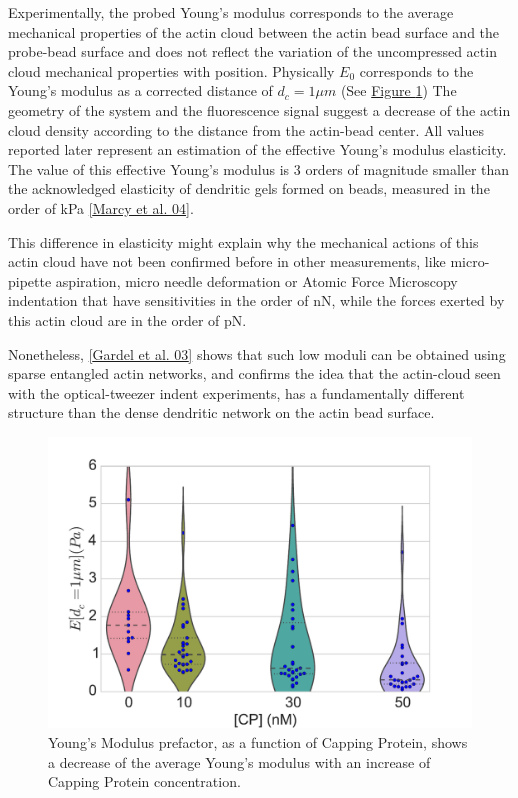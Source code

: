 \documentclass[A4paperpaper,11pt,english]{sphinxmanual}
\begin{document}
Experimentally, the probed Young's modulus corresponds to the average mechanical
properties of the actin cloud between the actin bead surface and the
probe-bead surface and does not reflect the variation of the uncompressed actin cloud mechanical
properties with position.
Physically \(E_0\) corresponds to the Young's modulus as a corrected distance of \(d_c = 1 \mu{}m\)
(See \hyperref[index-latex:ev]{Figure  \ref*{index-latex:ev}})
The geometry of the
system and the fluorescence signal suggest a decrease of the actin cloud density according to the distance from the actin-bead center. All values
reported later represent an estimation of the effective Young’s modulus elasticity. The value of this effective Young's modulus is 3 orders of magnitude
smaller than the acknowledged elasticity of dendritic gels formed on beads, measured in the
order of kPa {\hyperref[index-latex:marcy2004]{{[}Marcy et al. 04{]}}}.

This difference in elasticity might explain why the mechanical actions of this actin cloud have not been
confirmed before in other measurements, like micro-pipette aspiration,
micro needle deformation or Atomic Force Microscopy indentation that have
sensitivities in the order of nN, while the forces exerted by this actin cloud
are in the order of pN.

Nonetheless, {\hyperref[index-latex:gardel2003]{{[}Gardel et al. 03{]}}} shows that such low moduli can be obtained using
sparse entangled actin networks, and confirms the idea that the actin-cloud seen
with the optical-tweezer indent experiments, has a fundamentally different
structure than the dense dendritic network on the actin
bead surface.
\begin{figure}[htbp]
\centering
\capstart

\includegraphics[width=0.800\linewidth]{E0_violin.pdf}
\caption{Young's Modulus prefactor, as a function of Capping Protein, shows a decrease of the
average Young's modulus with an increase of Capping Protein concentration.}\label{index-latex:ev}\end{figure}
\end{document}

